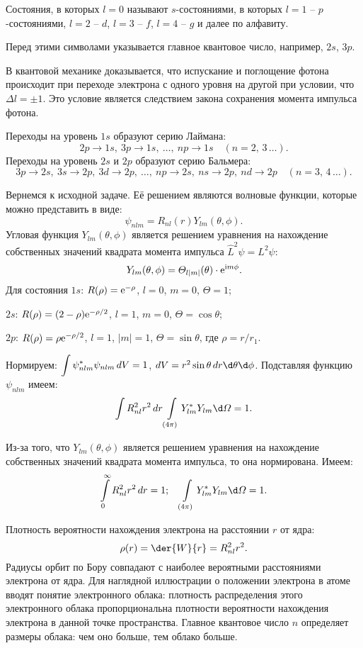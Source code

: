 Состояния, в которых \( l = 0 \) называют \( s \)-состояниями, в которых
\( l = 1 \) -- \( p \)-состояниями, \( l = 2 \) -- \( d \), \( l = 3 \) --
\( f \), \( l = 4 \) -- \( g \) и далее по алфавиту.
    
Перед этими символами указывается главное квантовое число, например, \( 2s \),
\( 3p \).

В квантовой механике доказывается, что испускание и поглощение фотона происходит
при переходе электрона с одного уровня на другой при условии, что \( \Delta l =
\pm 1 \). Это условие является следствием закона сохранения момента импульса
фотона.

Переходы на уровень \( 1s \) образуют серию Лаймана:
\[
    2p \to 1s,\ 3p \to 1s,\ \ldots,\ np \to 1s \quad (n = 2,\,3\,\ldots).
\]
Переходы на уровень \( 2s \) и \( 2p \) образуют серию Бальмера:
\[
    3p \to 2s,\ 3s \to 2p,\ 3d \to 2p,\ \ldots,\ np \to 2s,\ ns \to 2p,\ nd \to
    2p \quad (n = 3,\,4\,\ldots).
\]

Вернемся к исходной задаче. Её решением являются волновые функции, которые можно
представить в виде:
\[
    \psi_{nlm} = R_{nl}(r) Y_{lm}(\theta, \phi).
\]
Угловая функция \( Y_{lm}(\theta, \phi) \) является решением уравнения на
нахождение собственных значений квадрата момента импульса
\( \hat{L}^2\psi = L^2\psi \):
\[
    Y_{lm}(\theta, \phi) = \varTheta_{l|m|}(\theta)\cdot\mathrm{e}^{\mathrm{i} m\phi}.
\]
Для состояния \( 1s \): \( R(\rho) = \mathrm{e}^{-\rho} \), \( l = 0 \), \( m = 0 \),
\( \varTheta = 1 \);

\( 2s \): \( R(\rho) = (2 - \rho)\mathrm{e}^{-\rho/2} \), \( l = 1 \), \( m = 0 \),
\( \varTheta = \cos\theta \);

\( 2p \): \( R(\rho) = \rho\mathrm{e}^{-\rho/2} \), \( l = 1 \), \( |m| = 1 \),
\( \varTheta = \sin\theta \), где \( \rho = r/r_1 \).

Нормируем: \( \displaystyle \int\psi^*_{nlm}\psi_{nlm}\,dV = 1 \), \( dV = r^2\sin\theta\,
dr\d\theta\d\phi \). Подставляя функцию \( \psi_{nlm} \) имеем:
\[
    \int R_{nl}^2 r^2\,dr \int\limits_{(4\pi)} Y^*_{lm} Y_{lm}\d\varOmega = 1.
\]

Из-за того, что \( Y_{lm}(\theta, \phi) \) является решением уравнения на
нахождение собственных значений квадрата момента импульса, то она нормирована.
Имеем:
\[
    \int\limits_0^\infty R_{nl}^2 r^2\,dr = 1; \quad \int\limits_{(4\pi)}
    Y^*_{lm}Y_{lm}\d\varOmega = 1.
\]

Плотность вероятности нахождения электрона на расстоянии \( r \) от ядра:
\[
    \rho(r) = \der{W}{r} = R_{nl}^2 r^2.
\]
Радиусы орбит по Бору совпадают с наиболее вероятными расстояниями электрона от
ядра. Для наглядной иллюстрации о положении электрона в атоме вводят понятие
электронного облака: плотность распределения этого электронного облака
пропорциональна плотности вероятности нахождения электрона в данной точке
пространства. Главное квантовое число \( n \) определяет размеры облака: чем
оно больше, тем облако больше.

\newpage
